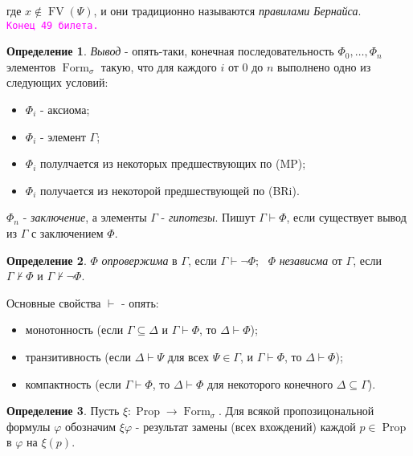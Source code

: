\documentclass[a4paper,100pt]{article}
\theoremstyle{indented}
\theoremstyle{definition}
\newtheorem{defn}{Определение}
\theoremstyle{remark}
\DeclareMathOperator{\Prop}{Prop}
\DeclareMathOperator{\form}{Form}
\DeclareMathOperator{\FV}{FV}
\begin{document}
где $x \notin \FV(\Psi)$, и они традиционно называются \textit{правилами Бернайса}. \\

\texttt{\textcolor{magenta}{Конец 49 билета.}} 

\hrulefill

\begin{defn}
  \textit{Вывод} - опять-таки, конечная последовательность $\Phi_0, \ldots, \Phi_n$ элементов $\form_\sigma$ такую, что для каждого $i$ от 0 до $n$ выполнено одно из следующих условий:

  \begin{itemize}
    \item $\Phi_i$ - аксиома; 
    \item $\Phi_i$ - элемент $\Gamma$; 
    \item $\Phi_i$ полулчается из некоторых предшествующих по (MP);
    \item $\Phi_i$ получается из некоторой предшествующей по (BRi). 
  \end{itemize}

  $\Phi_n$ - \textit{заключение}, а элементы $\Gamma$ - \textit{гипотезы}. Пишут $\Gamma \vdash \Phi$, если существует вывод из $\Gamma$ с заключением $\Phi$. 
\end{defn}

\begin{defn}
  $\Phi$ \textit{опровержима} в $\Gamma$, если $\Gamma \vdash \neg \Phi$; \ 
  $\Phi$ \textit{независма} от $\Gamma$, если $\Gamma \nvdash \Phi$ и $\Gamma \nvdash \neg \Phi$. 
\end{defn}

Основные свойства $\vdash$ - опять:

\begin{itemize}
  \item монотонность (если $\Gamma \subseteq \Delta$ и $\Gamma \vdash \Phi$, то $\Delta \vdash \Phi$); 
  \item транзитивность (если $\Delta \vdash \Psi$ для всех $\Psi \in \Gamma$, и $\Gamma \vdash \Phi$, то $\Delta \vdash \Phi$);
  \item компактность (если $\Gamma \vdash \Phi$, то $\Delta \vdash \Phi$ для некоторого конечного $\Delta \subseteq \Gamma$).
\end{itemize}

\begin{defn}
  Пусть $\xi: \Prop \rightarrow \form_\sigma$. Для всякой пропозицональной формулы $\varphi$ обозначим $\xi \varphi$ - результат замены (всех вхождений) каждой $p\in \Prop$ в $\varphi$ на $\xi(p)$. 
\end{defn}
\end{document}
